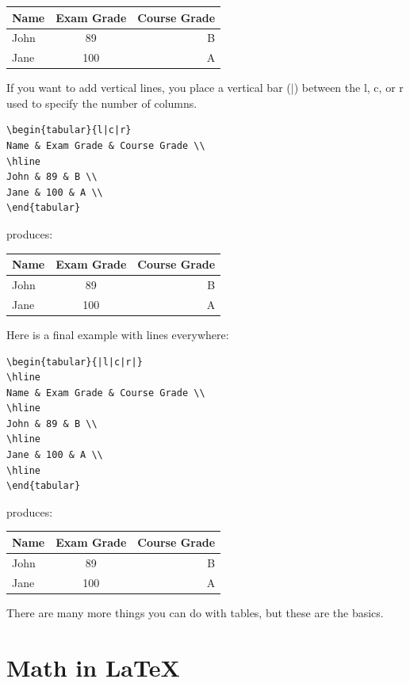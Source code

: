 \documentclass[12pt]{article}
\begin{document}
\begin{tabular}{lcr}
Name & Exam Grade & Course Grade \\
\hline
John & 89 & B \\
Jane & 100 & A \\
\end{tabular}

If you want to add vertical lines, you place a vertical bar ($|$) between the l, c, or r used to specify the number of columns.

\begin{verbatim}
\begin{tabular}{l|c|r}
Name & Exam Grade & Course Grade \\
\hline
John & 89 & B \\
Jane & 100 & A \\
\end{tabular}
\end{verbatim}

produces:

\begin{tabular}{l|c|r}
Name & Exam Grade & Course Grade \\
\hline
John & 89 & B \\
Jane & 100 & A \\
\end{tabular}

Here is a final example with lines everywhere:

\begin{verbatim}
\begin{tabular}{|l|c|r|}
\hline
Name & Exam Grade & Course Grade \\
\hline
John & 89 & B \\
\hline
Jane & 100 & A \\
\hline
\end{tabular}
\end{verbatim}

produces:

\begin{tabular}{|l|c|r|}
\hline
Name & Exam Grade & Course Grade \\
\hline
John & 89 & B \\
\hline
Jane & 100 & A \\
\hline
\end{tabular}

There are many more things you can do with tables, but these are the basics.

\section{Math in \LaTeX}
\end{document}
